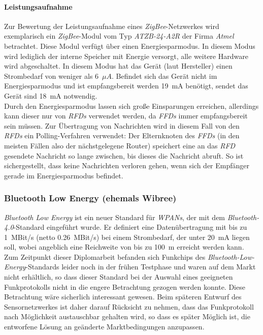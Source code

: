             \paragraph{Leistungsaufnahme}
                Zur Bewertung der Leistungsaufnahme eines \emph{ZigBee}-Netzwerkes wird exemplarisch ein 
                \emph{ZigBee}-Modul
                vom Typ \emph{ATZB-24-A2R} der Firma \emph{Atmel} betrachtet. Diese Modul verfügt über einen 
                Energiesparmodus.  In diesem Modus wird lediglich der interne Speicher mit Energie versorgt, alle 
                weitere Hardware wird abgeschaltet. In diesem Modus hat das Gerät (laut Hersteller) einen Strombedarf 
                von weniger als 6~$\mu{}A$. Befindet sich das Gerät nicht im Energiesparmodus und ist empfangsbereit 
                werden 19~mA benötigt, sendet das Gerät sind 18~mA notwendig.\\
                Durch den Energiesparmodus lassen sich große Einsparungen erreichen, allerdings kann dieser nur von 
                \emph{RFDs} verwendet werden, da \emph{FFDs} immer empfangsbereit sein müssen. Zur Übertragung von 
                Nachrichten wird in diesem Fall von den \emph{RFDs} ein Polling-Verfahren verwendet: Der Elternknoten des 
                \emph{FFDs} (in den meisten Fällen also der nächstgelegene Router) speichert eine an das \emph{RFD}
                gesendete Nachricht so lange zwischen,
                bis dieses die Nachricht abruft. So ist sichergestellt, dass keine Nachrichten verloren gehen, wenn
                sich der Empfänger gerade im Energiesparmodus befindet.
           

        \subsubsection{Bluetooth Low Energy (ehemals Wibree)}\label{wibree}
            \emph{Bluetooth Low Energy} ist ein neuer Standard für \emph{WPANs}, der mit dem \emph{Bluetooth-4.0}-Standard 
            eingeführt wurde. Er definiert eine Datenübertragung mit bis zu 1~MBit/s (netto 0.26~MBit/s) bei einem 
            Strombedarf, der unter 20~mA liegen soll, wobei angeblich eine Reichweite von bis zu 100~m erreicht werden 
            kann.\\
            Zum Zeitpunkt dieser Diplomarbeit befanden sich Funkchips des \emph{Bluetooth-Low-Energy}-Standards 
            leider noch in der frühen Testphase und waren auf dem Markt nicht erhältlich, so dass dieser Standard 
            bei der Auswahl eines geeigneten Funkprotokolls nicht in die engere Betrachtung gezogen werden konnte.
            Diese Betrachtung wäre sicherlich interessant gewesen. Beim späteren Entwurf des Sensornetzwerkes
            ist daher darauf Rücksicht zu nehmen, dass das Funkprotokoll nach Möglichkeit austauschbar gehalten wird,
            so dass es später Möglich ist, die entworfene Lösung an geänderte Marktbedingungen anzupassen.
            

